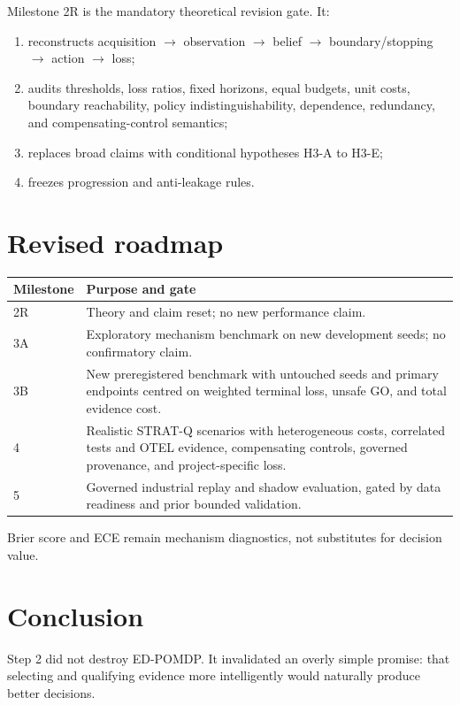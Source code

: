 \documentclass[11pt,a4paper]{article}
\begin{document}
Milestone 2R is the mandatory theoretical revision gate. It:
\begin{enumerate}
  \item reconstructs acquisition $\rightarrow$ observation $\rightarrow$ belief $\rightarrow$ boundary/stopping $\rightarrow$ action $\rightarrow$ loss;
  \item audits thresholds, loss ratios, fixed horizons, equal budgets, unit costs, boundary reachability, policy indistinguishability, dependence, redundancy, and compensating-control semantics;
  \item replaces broad claims with conditional hypotheses H3-A to H3-E;
  \item freezes progression and anti-leakage rules.
\end{enumerate}

\section{Revised roadmap}

\begin{longtable}{p{}p{}}
\toprule
Milestone & Purpose and gate \\
\midrule
2R & Theory and claim reset; no new performance claim. \\
3A & Exploratory mechanism benchmark on new development seeds; no confirmatory claim. \\
3B & New preregistered benchmark with untouched seeds and primary endpoints centred on weighted terminal loss, unsafe GO, and total evidence cost. \\
4 & Realistic STRAT-Q scenarios with heterogeneous costs, correlated tests and OTEL evidence, compensating controls, governed provenance, and project-specific loss. \\
5 & Governed industrial replay and shadow evaluation, gated by data readiness and prior bounded validation. \\
\bottomrule
\end{longtable}

Brier score and ECE remain mechanism diagnostics, not substitutes for decision value.

\section{Conclusion}

Step 2 did not destroy ED-POMDP. It invalidated an overly simple promise: that selecting and qualifying evidence more intelligently would naturally produce better decisions.
\end{document}
